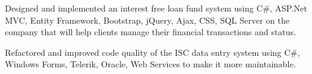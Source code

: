 \begin{cventries}
{\begin{cvitems}
\item {Designed and implemented an interest free loan fund system using C\#, ASP.Net MVC, Entity Framework, Bootstrap, jQuery, Ajax, CSS, SQL Server on the company that will help clients manage their financial transactions and status.}
\item {Refactored and improved code quality of the ISC data entry system using C\#, Windows Forms, Telerik, Oracle, Web Services to make it more maintainable.}
\end{cvitems}
}


\end{cventries}
